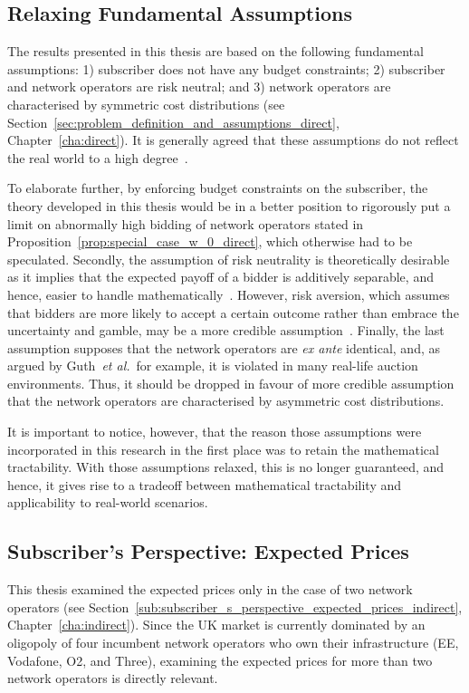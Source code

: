 \subsection{Relaxing Fundamental Assumptions}
\label{sub:relaxing_fundamental_assumptions_conclusions}
The results presented in this thesis are based on the following fundamental assumptions: 1) subscriber does not have any budget constraints; 2) subscriber and network operators are risk neutral; and 3) network operators are characterised by symmetric cost distributions (see Section~\ref{sec:problem_definition_and_assumptions_direct}, Chapter~\ref{cha:direct}). It is generally agreed that these assumptions do not reflect the real world to a high degree~\cite{Krishna10}.

To elaborate further, by enforcing budget constraints on the subscriber, the theory developed in this thesis would be in a better position to rigorously put a limit on abnormally high bidding of network operators stated in Proposition~\ref{prop:special_case_w_0_direct}, which otherwise had to be speculated. Secondly, the assumption of risk neutrality is theoretically desirable as it implies that the expected payoff of a bidder is additively separable, and hence, easier to handle mathematically~\cite{Krishna10}. However, risk aversion, which assumes that bidders are more likely to accept a certain outcome rather than embrace the uncertainty and gamble, may be a more credible assumption~\cite{Liu2003}. Finally, the last assumption supposes that the network operators are \emph{ex ante} identical, and, as argued by Guth~\emph{et al.}~for example, it is violated in many real-life auction environments. Thus, it should be dropped in favour of more credible assumption that the network operators are characterised by asymmetric cost distributions. 

It is important to notice, however, that the reason those assumptions were incorporated in this research in the first place was to retain the mathematical tractability. With those assumptions relaxed, this is no longer guaranteed, and hence, it gives rise to a tradeoff between mathematical tractability and applicability to real-world scenarios.

\subsection{Subscriber's Perspective: Expected Prices}
\label{sub:subscribers_perspective_expected_prices_conclusions}
This thesis examined the expected prices only in the case of two network operators (see Section~\ref{sub:subscriber_s_perspective_expected_prices_indirect}, Chapter~\ref{cha:indirect}). Since the UK market is currently dominated by an oligopoly of four incumbent network operators who own their infrastructure (EE, Vodafone, O2, and Three), examining the expected prices for more than two network operators is directly relevant.

